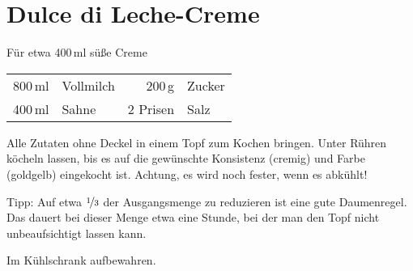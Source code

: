 \section*{Dulce di Leche-Creme}
\begin{centering}
Für etwa 400\,ml süße Creme
\end{centering}
\begin{table}[H]
\centering
\begin{tabular*}{1\textwidth}{rlrl}
800\,ml & Vollmilch & 200\,g & Zucker \\
400\,ml & Sahne & 2 Prisen & Salz \\
\end{tabular*}
\end{table}
\begin{Notes}
\item Alle Zutaten ohne Deckel in einem Topf zum Kochen bringen. Unter Rühren köcheln lassen, bis es auf die gewünschte Konsistenz (cremig) und Farbe (goldgelb) eingekocht ist. Achtung, es wird noch fester, wenn es abkühlt! 
\item Tipp: Auf etwa $\nicefrac{1}{3}$ der Ausgangsmenge zu reduzieren ist eine gute Daumenregel. Das dauert bei dieser Menge etwa eine Stunde, bei der man den Topf nicht unbeaufsichtigt lassen kann. 
\item Im Kühlschrank aufbewahren.
\end{Notes}




